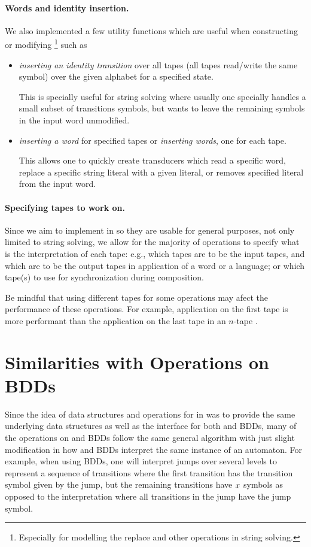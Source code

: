 \paragraph{Words and identity insertion.}
We also implemented a few utility functions which are useful when constructing or modifying \nfts\footnote{Especially for modelling the replace and other operations in string solving.} such as
\begin{itemize}
  \item \emph{inserting an identity transition} over all tapes (all tapes read/write the same symbol) over the given alphabet for a specified state.

  This is specially useful for string solving where usually one specially handles a small subset of transitions symbols, but wants to leave the remaining symbols in the input word unmodified.

  \item \emph{inserting a word} for specified tapes or \emph{inserting words}, one for each tape.

  This allows one to quickly create transducers which read a specific word, replace a specific string literal with a given literal, or removes specified literal from the input word.
\end{itemize}

\paragraph{Specifying tapes to work on.}
Since we aim to implement \nfts in \mata so they are usable for general purposes, not only limited to string solving, we allow for the majority of operations to specify what is the interpretation of each tape: e.g., which tapes are to be the input tapes, and which are to be the output tapes in application of a word or a language; or which tape(s) to use for synchronization during composition.

Be mindful that using different tapes for some operations may afect the performance of these operations. For example, application on the first tape is more performant than the application on the last tape in an $n$-tape \nft.

\section{Similarities with Operations on BDDs}

Since the idea of data structures and operations for \nfts in \mata was to provide the same underlying data structures as well as the interface for both \nfts and BDDs, many of the operations on \nfts and BDDs follow the same general algorithm with just slight modification in how \nfts and BDDs interpret the same instance of an \nft automaton.
For example, when using BDDs, one will interpret jumps over several levels to represent a sequence of transitions where the first transition has the transition symbol given by the jump, but the remaining transitions have $x$ symbols as opposed to the \nft interpretation where all transitions in the jump have the jump symbol.

